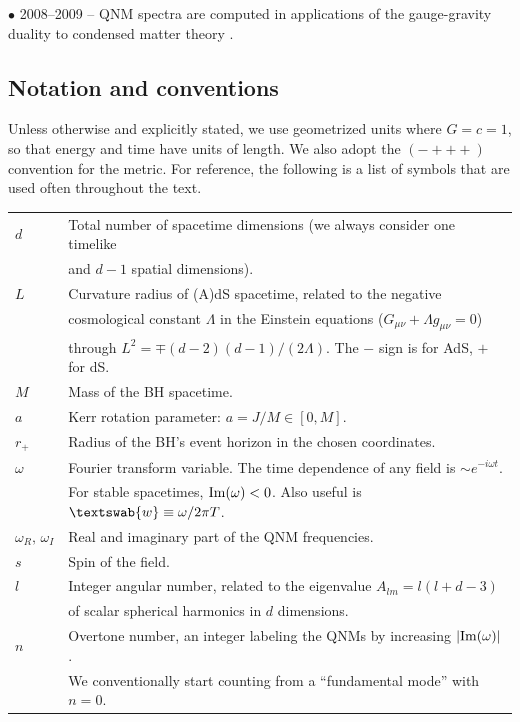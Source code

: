 \documentclass[]{iopart}
\newcommand{\wn}{{\textswab{w}}}
\begin{document}
\noindent $\bullet$ 2008--2009 -- QNM spectra are computed in applications of
the gauge-gravity duality to condensed matter theory
\cite{Hartnoll:2009sz,Herzog:2009xv}.

\subsection{Notation and conventions}

Unless otherwise and explicitly stated, we use geometrized units where
$G=c=1$, so that energy and time have units of length. We also adopt the
$(-+++)$ convention for the metric.  For reference, the following is a list of
symbols that are used often throughout the text.

\begin{table}[h]
\begin{tabular}{ll}
  $d$ & Total number of spacetime dimensions (we always consider one timelike\\
      & and $d-1$ spatial dimensions).\\
  $L$ & Curvature radius of (A)dS spacetime, related to the negative \\
      & cosmological constant $\Lambda$ in the Einstein equations 
        ($G_{\mu\nu}+\Lambda g_{\mu\nu}=0$) \\
  & through $L^2=\mp(d-2)(d-1)/(2\Lambda)$. The $-$ sign is for AdS, $+$ for
  dS.\\
  $M$ & Mass of the BH spacetime. \\
  $a$ & Kerr rotation parameter: $a = J/M \in [0,M]$.\\
  $r_+$ & Radius of the BH's event horizon in the chosen coordinates.\\
  $\omega$ & Fourier transform variable. The time dependence of any
  field is $\sim e^{-i\omega t}$.  \\
  & For stable spacetimes, ${\rm Im}(\omega)<0$. Also useful is $\wn\equiv
  \omega/2\pi T$.\\
  $\omega_R,\,\omega_I$ & Real and imaginary part of the QNM
  frequencies.\\
  $s$ & Spin of the field.\\
  $l$ & Integer angular number, related to the eigenvalue $A_{lm}=l(l+d-3)$\\ 
  &of scalar spherical harmonics in $d$ dimensions.\\ 
  $n$ & Overtone number, an integer labeling the QNMs by increasing $|{\rm
    Im}(\omega)|$.\\
  & We conventionally start counting from a ``fundamental mode'' with $n=0$.\\
\end{tabular}
\end{table}
\end{document}
